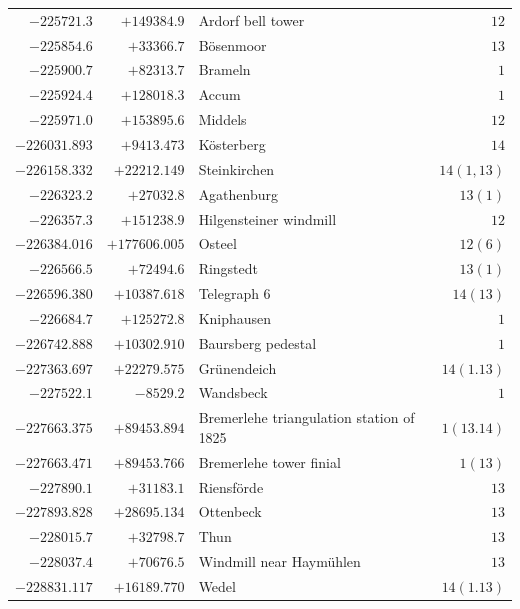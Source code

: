 \begin{center}
\begin{tabular}{r|r|p{170pt}|r}
\(-225721.3\)&\(+149384.9\)&Ardorf bell tower&\(12\)\\
\(-225854.6\)&\(+33366.7\)&Bösenmoor&\(13\)\\
\(-225900.7\)&\(+82313.7\)&Brameln&\(1\)\\
\(-225924.4\)&\(+128018.3\)&Accum&\(1\)\\
\(-225971.0\)&\(+153895.6\)&Middels&\(12\)\\
\(-226031.893\)&\(+9413.473\)&Kösterberg&\(14\)\\
\(-226158.332\)&\(+22212.149\)&Steinkirchen&\(14(1,13)\)\\
\(-226323.2\)&\(+27032.8\)&Agathenburg&\(13(1)\)\\
\(-226357.3\)&\(+151238.9\)&Hilgensteiner windmill&\(12\)\\
\(-226384.016\)&\(+177606.005\)&Osteel&\(12(6)\)\\
\(-226566.5\)&\(+72494.6\)&Ringstedt&\(13(1)\)\\
\(-226596.380\)&\(+10387.618\)&Telegraph 6&\(14(13)\)\\
\(-226684.7\)&\(+125272.8\)&Kniphausen&\(1\)\\
\(-226742.888\)&\(+10302.910\)&Baursberg pedestal&\(1\)\\
\(-227363.697\)&\(+22279.575\)&Grünendeich&\(14(1.13)\)\\
\(-227522.1\)&\(-8529.2\)&Wandsbeck&\(1\)\\
\(-227663.375\)&\(+89453.894\)&Bremerlehe triangulation station of 1825&\(1(13.14)\)\\
\(-227663.471\)&\(+89453.766\)&Bremerlehe tower finial&\(1(13)\)\\
\(-227890.1\)&\(+31183.1\)&Riensförde&\(13\)\\
\(-227893.828\)&\(+28695.134\)&Ottenbeck&\(13\)\\
\(-228015.7\)&\(+32798.7\)&Thun&\(13\)\\
\(-228037.4\)&\(+70676.5\)&Windmill near Haymühlen&\(13\)\\
\(-228831.117\)&\(+16189.770\)&Wedel&\(14(1.13)\)\\
\hline\end{tabular}\endgroup\end{center}
\clearpage
